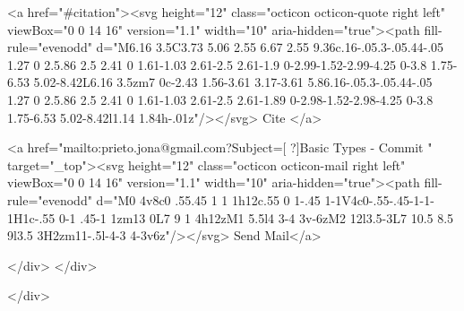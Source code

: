      <a  href="#citation"><svg height="12" class="octicon octicon-quote right left" viewBox="0 0 14 16" version="1.1" width="10" aria-hidden="true"><path fill-rule="evenodd" d="M6.16 3.5C3.73 5.06 2.55 6.67 2.55 9.36c.16-.05.3-.05.44-.05 1.27 0 2.5.86 2.5 2.41 0 1.61-1.03 2.61-2.5 2.61-1.9 0-2.99-1.52-2.99-4.25 0-3.8 1.75-6.53 5.02-8.42L6.16 3.5zm7 0c-2.43 1.56-3.61 3.17-3.61 5.86.16-.05.3-.05.44-.05 1.27 0 2.5.86 2.5 2.41 0 1.61-1.03 2.61-2.5 2.61-1.89 0-2.98-1.52-2.98-4.25 0-3.8 1.75-6.53 5.02-8.42l1.14 1.84h-.01z"/></svg> Cite
      </a>

      <a href="mailto:prieto.jona@gmail.com?Subject=[ ?]Basic Types - Commit " target="_top"><svg height="12" class="octicon octicon-mail right left" viewBox="0 0 14 16" version="1.1" width="10" aria-hidden="true"><path fill-rule="evenodd" d="M0 4v8c0 .55.45 1 1 1h12c.55 0 1-.45 1-1V4c0-.55-.45-1-1-1H1c-.55 0-1 .45-1 1zm13 0L7 9 1 4h12zM1 5.5l4 3-4 3v-6zM2 12l3.5-3L7 10.5 8.5 9l3.5 3H2zm11-.5l-4-3 4-3v6z"/></svg> Send Mail</a>

    </div>
  </div>

</div>




